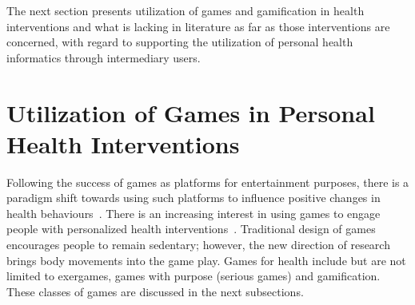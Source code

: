 The next section presents utilization of games and gamification in health interventions and what is lacking in literature as far as those interventions are concerned, with regard to supporting the utilization of personal health informatics through intermediary users.

\section{Utilization of Games in Personal Health Interventions}
Following the success of games as platforms for entertainment purposes, there is a paradigm shift towards using such platforms to influence positive changes in health behaviours~\citep{king2013gamification}. There is an increasing interest in using games to engage people with personalized health interventions~\citep{mccallum2012gamification}. Traditional design of games encourages people to remain sedentary; however, the new direction of research brings body movements into the game play. Games for health include but are not limited to exergames, games with purpose (serious games) and gamification. These classes of games are discussed in the next subsections. 
